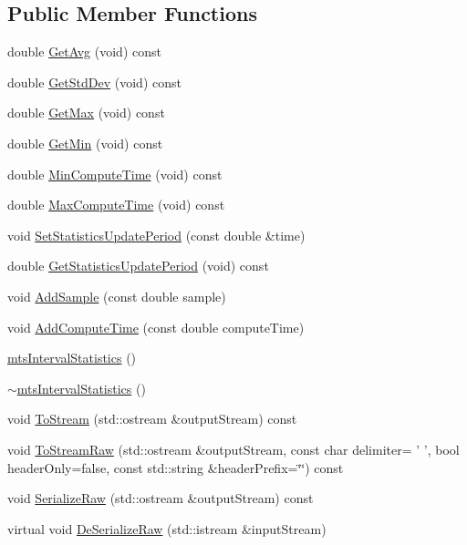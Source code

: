 \subsection*{Public Member Functions}
\begin{DoxyCompactItemize}
\item 
double \hyperlink{classmts_interval_statistics_a78d4ee8d06b649edda768bd78f64e227}{Get\-Avg} (void) const 
\item 
double \hyperlink{classmts_interval_statistics_ad544bdd39b772d638923ee7e5d1d76e2}{Get\-Std\-Dev} (void) const 
\item 
double \hyperlink{classmts_interval_statistics_a37dfcf3ca62d8a1f05b6b0b554a9e084}{Get\-Max} (void) const 
\item 
double \hyperlink{classmts_interval_statistics_aede03b7f8f081cf40f4db3f7ff63d635}{Get\-Min} (void) const 
\item 
double \hyperlink{classmts_interval_statistics_a8c168d10dc2fad2156f5fea9f413a51d}{Min\-Compute\-Time} (void) const 
\item 
double \hyperlink{classmts_interval_statistics_a3b93fdd05e74ef0933effa0754563a2a}{Max\-Compute\-Time} (void) const 
\item 
void \hyperlink{classmts_interval_statistics_a659cb1005642f9e4332dfc528b948aff}{Set\-Statistics\-Update\-Period} (const double \&time)
\item 
double \hyperlink{classmts_interval_statistics_a402120b2624be728d11231cf93f7e99f}{Get\-Statistics\-Update\-Period} (void) const 
\item 
void \hyperlink{classmts_interval_statistics_a14f876fd34e6dfbf6625a495f9c9bb0e}{Add\-Sample} (const double sample)
\item 
void \hyperlink{classmts_interval_statistics_ab602553c4e0c91c2d3cc1e0210828917}{Add\-Compute\-Time} (const double compute\-Time)
\item 
\hyperlink{classmts_interval_statistics_a3d0c34a5a126ebfbb5d8e665613a7d32}{mts\-Interval\-Statistics} ()
\item 
\hyperlink{classmts_interval_statistics_ae8d2cde55f985fb99392a7c9fed95265}{$\sim$mts\-Interval\-Statistics} ()
\item 
void \hyperlink{classmts_interval_statistics_a19fcd98cd32d96a6d46953dd7bf9c571}{To\-Stream} (std\-::ostream \&output\-Stream) const 
\item 
void \hyperlink{classmts_interval_statistics_a4a6546735b638f8c88a5031302520788}{To\-Stream\-Raw} (std\-::ostream \&output\-Stream, const char delimiter= ' ', bool header\-Only=false, const std\-::string \&header\-Prefix=\char`\"{}\char`\"{}) const 
\item 
void \hyperlink{classmts_interval_statistics_ab63b417d42eace74ef8f688f768e2c17}{Serialize\-Raw} (std\-::ostream \&output\-Stream) const 
\item 
virtual void \hyperlink{classmts_interval_statistics_a4b5f087223826a7ddc6f6b8c1c7763a1}{De\-Serialize\-Raw} (std\-::istream \&input\-Stream)
\end{DoxyCompactItemize}



